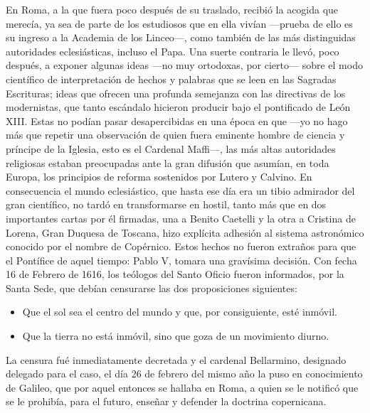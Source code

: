 \documentclass[a4paper, 12pt, draft]{article}
\begin{document}
{En Roma, a la que fuera poco después de su traslado, recibió la acogida que merecía, ya sea de parte de los estudiosos que en ella vivían ---prueba de ello es su ingreso a la Academia de los Linceo---, como también de las más distinguidas autoridades eclesiásticas, incluso el Papa. Una suerte contraria le llevó, poco después, a exponer algunas ideas ---no muy ortodoxas, por cierto--- sobre el modo científico de interpretación de hechos y palabras que se leen en las Sagradas Escrituras; ideas que ofrecen una profunda semejanza con las directivas de los modernistas, que tanto escándalo hicieron producir bajo el pontificado de León XIII. Estas no podían pasar desapercibidas en una época en que ---yo no hago más que repetir una observación de quien fuera eminente hombre de ciencia y príncipe de la Iglesia, esto es el Cardenal Maffi---, las más altas autoridades religiosas estaban preocupadas ante la gran difusión que asumían, en toda Europa, los principios de reforma sostenidos por Lutero y Calvino. En consecuencia el mundo eclesiástico, que hasta ese día era un tibio admirador del gran científico, no tardó en transformarse en hostil, tanto más que en dos importantes cartas por él firmadas, una a Benito Caetelli y la otra a Cristina de Lorena, Gran Duquesa de Toscana, hizo explícita adhesión al sistema astronómico conocido por el nombre de Copérnico. Estos hechos no fueron extraños para que el Pontífice de aquel tiempo: Pablo V, tomara una gravísima decisión. Con fecha 16 de Febrero de 1616, los teólogos del Santo Oficio fueron informados, por la Santa Sede, que debían censurarse las dos proposiciones siguientes:

\begin{itemize}

\item Que el sol sea el centro del mundo y que, por consiguiente, esté in\-móvil.

\item Que la tierra no está inmóvil, sino que goza de un movimiento diurno.

\end{itemize}

La censura fué inmediatamente decretada y el cardenal Bellarmino, designado delegado para el caso, el día 26 de febrero del mismo año la puso en conocimiento de Galileo, que por aquel entonces se hallaba en Roma, a quien se le notificó que se le prohibía, para el futuro, enseñar y defender la doctrina copernicana.

}
\end{document}
